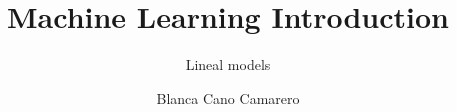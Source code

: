 \title{Machine Learning Introduction}
\subtitle{Lineal models}
\author{Blanca Cano Camarero}


\relax
{}\relax
{}\relax

\newcommand{\bgcolor}{blue}
